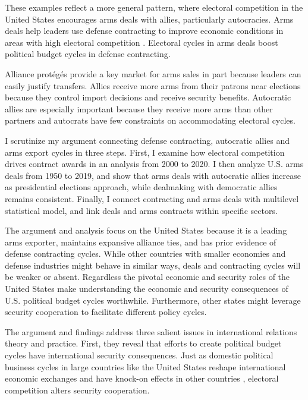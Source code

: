 \documentclass[12pt]{article}
\begin{document}
These examples reflect a more general pattern, where electoral competition in the United States encourages arms deals with allies, particularly autocracies.
Arms deals help leaders use defense contracting to improve economic conditions in areas with high electoral competition \citep{Tufte1978, Mintz1988, Mayer1995, DerouenHeo2000, Becker2021}. 
Electoral cycles in arms deals boost political budget cycles in defense contracting.


Alliance prot{\'e}g{\'e}s provide a key market for arms sales in part because leaders can easily justify transfers. 
Allies receive more arms from their patrons near elections because they control import decisions and receive security benefits. 
Autocratic allies are especially important because they receive more arms than other partners \citep{McManusYarhi-Milo2017} and autocrats have few constraints on accommodating electoral cycles.


I scrutinize my argument connecting defense contracting, autocratic allies and arms export cycles in three steps. 
First, I examine how electoral competition drives contract awards in an analysis from 2000 to 2020.
I then analyze U.S. arms deals from 1950 to 2019, and show that arms deals with autocratic allies increase as presidential elections approach, while dealmaking with democratic allies remains consistent. 
Finally, I connect contracting and arms deals with multilevel statistical model, and link deals and arms contracts within specific sectors.


The argument and analysis focus on the United States because it is a leading arms exporter, maintains expansive alliance ties, and has prior evidence of defense contracting cycles. 
While other countries with smaller economies and defense industries might behave in similar ways, deals and contracting cycles will be weaker or absent.
Regardless the pivotal economic and security roles of the United States make understanding the economic and security consequences of U.S. political budget cycles worthwhile.
Furthermore, other states might leverage security cooperation to facilitate different policy cycles. 


The argument and findings address three salient issues in international relations theory and practice. 
First, they reveal that efforts to create political budget cycles have international security consequences. 
Just as domestic political business cycles in large countries like the United States reshape international economic exchanges and have knock-on effects in other countries \citep{Kayser2006, Kayser2009}, electoral competition alters security cooperation. 
\end{document}
